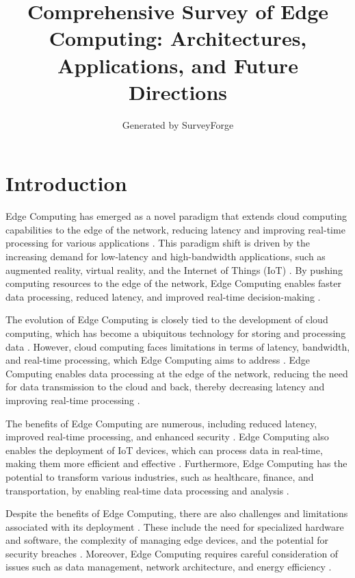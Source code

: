 \documentclass[11pt,a4paper]{article}
\title{Comprehensive Survey of Edge Computing: Architectures, Applications, and Future Directions}
\author{Generated by SurveyForge}
\date{}
\begin{document}
\maketitle
\tableofcontents
\newpage



\section{Introduction}


Edge Computing has emerged as a novel paradigm that extends cloud computing capabilities to the edge of the network, reducing latency and improving real-time processing for various applications \cite{arxiv:1702.05309}. This paradigm shift is driven by the increasing demand for low-latency and high-bandwidth applications, such as augmented reality, virtual reality, and the Internet of Things (IoT) \cite{arxiv:1611.05539}. By pushing computing resources to the edge of the network, Edge Computing enables faster data processing, reduced latency, and improved real-time decision-making \cite{arxiv:1702.06331}.

The evolution of Edge Computing is closely tied to the development of cloud computing, which has become a ubiquitous technology for storing and processing data \cite{arxiv:2101.10417}. However, cloud computing faces limitations in terms of latency, bandwidth, and real-time processing, which Edge Computing aims to address \cite{arxiv:2111.10076}. Edge Computing enables data processing at the edge of the network, reducing the need for data transmission to the cloud and back, thereby decreasing latency and improving real-time processing \cite{arxiv:1701.01090}.

The benefits of Edge Computing are numerous, including reduced latency, improved real-time processing, and enhanced security \cite{arxiv:2206.07164}. Edge Computing also enables the deployment of IoT devices, which can process data in real-time, making them more efficient and effective \cite{arxiv:1912.00595}. Furthermore, Edge Computing has the potential to transform various industries, such as healthcare, finance, and transportation, by enabling real-time data processing and analysis \cite{arxiv:2004.07311}.

Despite the benefits of Edge Computing, there are also challenges and limitations associated with its deployment \cite{arxiv:1609.01967}. These include the need for specialized hardware and software, the complexity of managing edge devices, and the potential for security breaches \cite{arxiv:1602.00484}. Moreover, Edge Computing requires careful consideration of issues such as data management, network architecture, and energy efficiency \cite{arxiv:1810.00305}.
\end{document}
